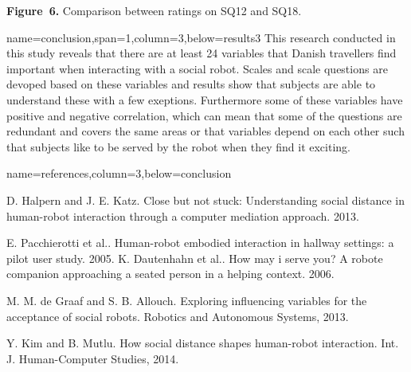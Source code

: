 \documentclass[paperwidth=118cm,paperheight=84cm,landscape,fontscale=0.2941]{baposter}
\begin{document}
\begin{poster}
{\textbf{Figure~6. }Comparison between ratings on SQ12 and SQ18.
}

{name=conclusion,span=1,column=3,below=results3}
{\parskip 5pt
This research conducted in this study reveals that there are at least 24 variables that Danish travellers find important when interacting with a social robot. Scales and scale questions are devoped based on these variables and results show that subjects are able to understand these with a few exeptions. Furthermore some of these variables have positive and negative correlation, which can mean that some of the questions are redundant and covers the same areas or that variables depend on each other such that subjects like to be served by the robot when they find it exciting.
}




{name=references,column=3,below=conclusion}
{
\renewcommand{\section}[2]{}%
\footnotesize
\noindent [1] D. Halpern and J. E. Katz. Close but not stuck: Understanding social distance in human-robot interaction through a computer mediation approach. 2013.

\vspace{1pt} 
\noindent [2] E. Pacchierotti et al.. Human-robot embodied interaction in hallway settings: a pilot user study. 2005.
\vspace{1pt}
\noindent[3] K. Dautenhahn et al.. How may i serve you? A robote companion approaching a seated person in a helping context. 2006.

\vspace{1pt}
\noindent [4] M. M. de Graaf and S. B. Allouch. Exploring influencing variables for the acceptance of social robots. Robotics and Autonomous Systems, 2013.

\vspace{1pt}
\noindent [5] Y. Kim and B. Mutlu. How social distance shapes human-robot interaction. Int. J. Human-Computer Studies, 2014.\\

}



\end{poster}
\end{document}

